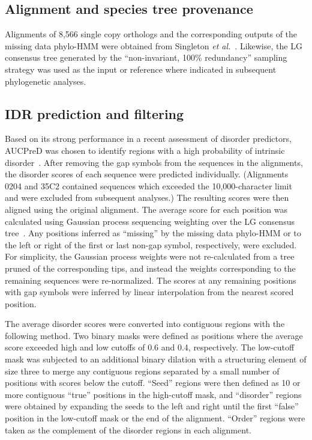\subsection{Alignment and species tree provenance}
Alignments of 8,566 single copy orthologs and the corresponding outputs of the missing data phylo-HMM were obtained from Singleton \textit{et al.}~\cite{Singleton2023}. Likewise, the LG consensus tree generated by the ``non-invariant, 100\% redundancy'' sampling strategy was used as the input or reference where indicated in subsequent phylogenetic analyses.

\subsection{IDR prediction and filtering}
Based on its strong performance in a recent assessment of disorder predictors, AUCPreD was chosen to identify regions with a high probability of intrinsic disorder~\cite{Wang2016, Necci2021}. After removing the gap symbols from the sequences in the alignments, the disorder scores of each sequence were predicted individually. (Alignments 0204 and 35C2 contained sequences which exceeded the 10,000-character limit and were excluded from subsequent analyses.) The resulting scores were then aligned using the original alignment. The average score for each position was calculated using Gaussian process sequencing weighting over the LG consensus tree~\cite{Altschul1989}. Any positions inferred as ``missing'' by the missing data phylo-HMM or to the left or right of the first or last non-gap symbol, respectively, were excluded. For simplicity, the Gaussian process weights were not re-calculated from a tree pruned of the corresponding tips, and instead the weights corresponding to the remaining sequences were re-normalized. The scores at any remaining positions with gap symbols were inferred by linear interpolation from the nearest scored position.

The average disorder scores were converted into contiguous regions with the following method. Two binary masks were defined as positions where the average score exceeded high and low cutoffs of 0.6 and 0.4, respectively. The low-cutoff mask was subjected to an additional binary dilation with a structuring element of size three to merge any contiguous regions separated by a small number of positions with scores below the cutoff. ``Seed'' regions were then defined as 10 or more contiguous ``true'' positions in the high-cutoff mask, and ``disorder'' regions were obtained by expanding the seeds to the left and right until the first ``false'' position in the low-cutoff mask or the end of the alignment. ``Order'' regions were taken as the complement of the disorder regions in each alignment.

